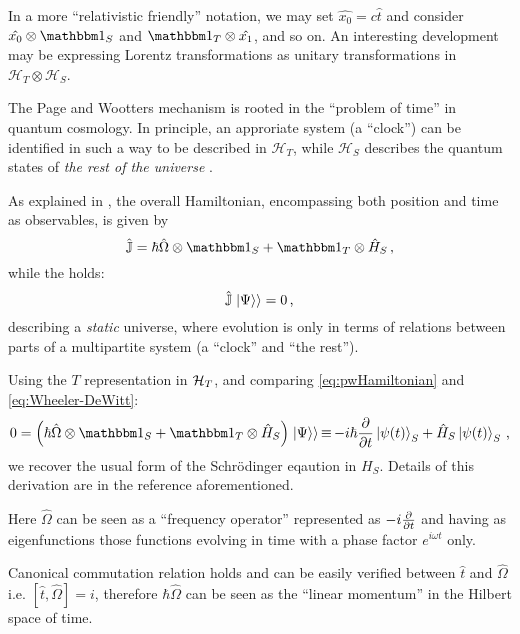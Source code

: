\begin{remark}
  In a more ``relativistic friendly'' notation, we may set
  $\hat{x_0} = c\hat{t}$ and consider
  $\hat{x_0} \otimes \idop_S$ and $\idop_T \otimes \hat{x_1}$,
  and so on. An interesting development may be expressing
  Lorentz transformations as unitary transformations in
  $\mathcal{H}_T \otimes \mathcal{H}_S$.
\end{remark}

The Page and Wootters mechanism is rooted in the ``problem of time''
in quantum cosmology.
In principle, an approriate system (a ``clock'') can be identified in such a way
to be described in $\mathcal{H}_T$, while $\mathcal{H}_S$ describes
the quantum states of \emph{the rest of the universe} \parencite{Marletto:Evolution}.

As explained in \cite{Lloyd:Time, Maccone:Pauli}, the overall Hamiltonian,
encompassing both position and time as observables, is given by
\begin{equation}\label{eq:pwHamiltonian}
  \hat{\mathbb{J}} = \hbar\hat{\Omega}\ox\idop_S + \idop_T\ox\hat{H}_S \,\text{,}
\end{equation}
while the  holds:
\begin{equation}\label{eq:Wheeler-DeWitt}
  \hat{\mathbb{J}}\left.\left| \Psi \right\rangle\right\rangle = 0 \,\text{,}
\end{equation}
describing a \emph{static} universe, where evolution is only
in terms of relations between parts of a multipartite system
(a ``clock'' and ``the rest'').

Using the $T$ representation in $\mathcal{H}_T$,
and comparing \eqref{eq:pwHamiltonian} and \eqref{eq:Wheeler-DeWitt}:
\begin{equation}\label{eq:schrod_from_pw}
  0 = \qty(\hbar\hat{\Omega}\ox\idop_S + \idop_{T}\ox\hat{H}_S)\dket{\Psi}
    \repr -i\hbar\pdv{t}\ket{\psi(t)}_{S} + \hat{H}_S\ket{\psi(t)}_{S}
    \,\text{,}
\end{equation}
we recover the usual form of the Schr\"{o}dinger eqaution in $H_S$.
Details of this derivation are in the reference aforementioned.

Here $\hat{\Omega}$ can be seen as a ``frequency operator''
represented as $-i\pdv{t}$ and having as eigenfunctions
those functions evolving in time with a phase factor $e^{i \omega t}$ only.

Canonical commutation relation holds and can be easily verified
between $\hat{t}$ and $\hat{\Omega}$
i.e. $[\hat{t}, \hat{\Omega}] = i$,
therefore $\hbar\hat{\Omega}$ can be seen as the ``linear momentum''
in the Hilbert space of time.

